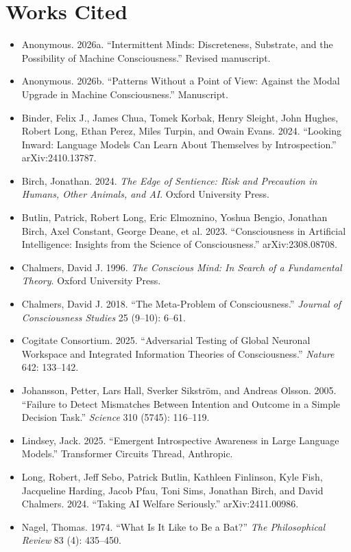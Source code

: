\documentclass[11pt]{article}
\begin{document}
\section*{Works Cited}
\begin{itemize}[leftmargin=2em, itemsep=2pt, label={}]
\itemsep0.35em
\item Anonymous. 2026a. ``Intermittent Minds: Discreteness, Substrate, and the Possibility of Machine Consciousness.'' Revised manuscript.
\item Anonymous. 2026b. ``Patterns Without a Point of View: Against the Modal Upgrade in Machine Consciousness.'' Manuscript.
\item Binder, Felix J., James Chua, Tomek Korbak, Henry Sleight, John Hughes, Robert Long, Ethan Perez, Miles Turpin, and Owain Evans. 2024. ``Looking Inward: Language Models Can Learn About Themselves by Introspection.'' arXiv:2410.13787.
\item Birch, Jonathan. 2024. \emph{The Edge of Sentience: Risk and Precaution in Humans, Other Animals, and AI}. Oxford University Press.
\item Butlin, Patrick, Robert Long, Eric Elmoznino, Yoshua Bengio, Jonathan Birch, Axel Constant, George Deane, et al. 2023. ``Consciousness in Artificial Intelligence: Insights from the Science of Consciousness.'' arXiv:2308.08708.
\item Chalmers, David J. 1996. \emph{The Conscious Mind: In Search of a Fundamental Theory}. Oxford University Press.
\item Chalmers, David J. 2018. ``The Meta-Problem of Consciousness.'' \emph{Journal of Consciousness Studies} 25 (9--10): 6--61.
\item Cogitate Consortium. 2025. ``Adversarial Testing of Global Neuronal Workspace and Integrated Information Theories of Consciousness.'' \emph{Nature} 642: 133--142.
\item Johansson, Petter, Lars Hall, Sverker Sikstr\"om, and Andreas Olsson. 2005. ``Failure to Detect Mismatches Between Intention and Outcome in a Simple Decision Task.'' \emph{Science} 310 (5745): 116--119.
\item Lindsey, Jack. 2025. ``Emergent Introspective Awareness in Large Language Models.'' Transformer Circuits Thread, Anthropic.
\item Long, Robert, Jeff Sebo, Patrick Butlin, Kathleen Finlinson, Kyle Fish, Jacqueline Harding, Jacob Pfau, Toni Sims, Jonathan Birch, and David Chalmers. 2024. ``Taking AI Welfare Seriously.'' arXiv:2411.00986.
\item Nagel, Thomas. 1974. ``What Is It Like to Be a Bat?'' \emph{The Philosophical Review} 83 (4): 435--450.

\end{itemize}
\end{document}
